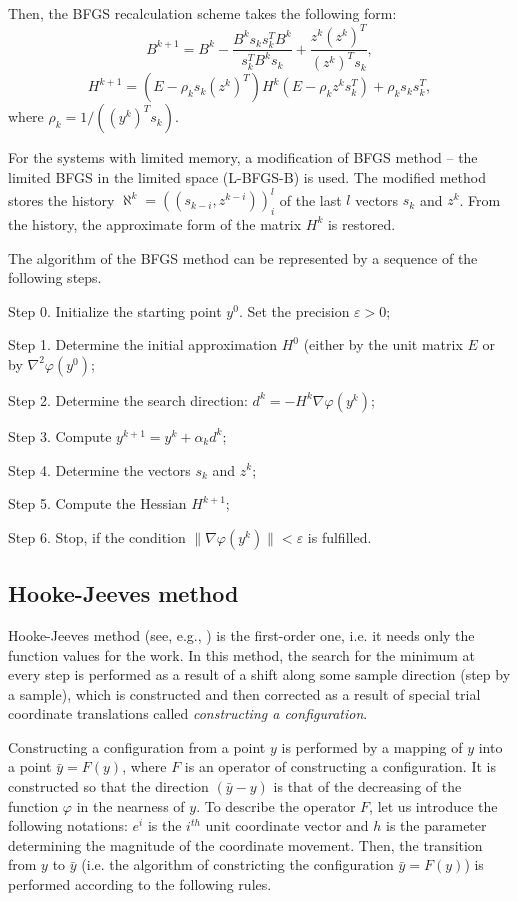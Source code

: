 \documentclass[runningheads]{llncs}
\begin{document}
Then, the BFGS recalculation scheme takes the following form:
$$ B^{k+1} = B^k - \frac{B^k s_k s_k^T B^k}{s_k^T B^k s_k} + \frac{z^k (z^k)^{T}}{(z^k)^{T} s_k},$$
$$ H^{k+1} = (E - \rho_k s_k (z^k)^{T}) H^k (E - \rho_k z^k s_k^T) + \rho_k s_k s_k^T,$$
where $\rho_k = 1/((y^k)^{T} s_k)$.

For the systems with limited memory, a modification of BFGS method -- the limited BFGS in the limited space (L-BFGS-B) is used. The modified method stores the history $\aleph^k = ((s_{k-i}, z^{k-i}))_i^l$ of the last $l$ vectors $s_k$ and $z^k$. From the history, the approximate form of the matrix $H^k$ is restored.

The algorithm of the BFGS method can be represented by a sequence of the following steps.

Step 0. Initialize the starting point $y^0$. Set the precision $\varepsilon > 0$;

Step 1. Determine the initial approximation $H^0$ (either by the unit matrix $E$ or by $\nabla^2 \varphi(y^0)$;

Step 2. Determine the search direction: $d^k = -H^k \nabla \varphi(y^k)$;

Step 3. Compute $y^{k+1} = y^k + \alpha_k d^k$;

Step 4. Determine the vectors $s_k$ and $z^k$;

Step 5. Compute the Hessian $H^{k+1}$;

Step 6. Stop, if the condition $\|\nabla \varphi(y^k)\| < \varepsilon$ is fulfilled.

\subsection{Hooke-Jeeves method}
Hooke-Jeeves method (see, e.g., \cite{Kelley}) is the first-order one, i.e. it needs only the function values for the work. In this method, the search for the minimum at every step is performed as a result of a shift along some sample direction (step by a sample), which is constructed and then corrected as a result of special trial coordinate translations called \textit{constructing a configuration}.

Constructing a configuration from a point $y$ is performed by a mapping of $y$ into a point $\bar{y} = F(y)$, where $F$ is an operator of constructing a configuration. It is constructed so that the direction $(\bar{y} - y)$ is that of the decreasing of the function $\varphi$ in the nearness of $y$. To describe the operator $F$, let us introduce the following notations: $e^i$ is the $i^{th}$ unit coordinate vector and $h$ is the parameter determining the magnitude of the coordinate movement. Then, the transition from $y$ to $\bar{y}$ (i.e. the algorithm of constricting the configuration $\bar{y} = F(y)$) is performed according to the following rules.
\end{document}
